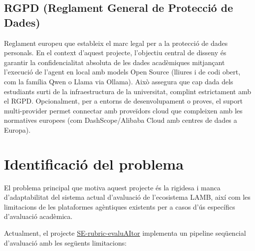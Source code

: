 \documentclass[12pt,a4paper,twoside]{report}
\begin{document}
\subsection{RGPD (Reglament General de Protecci\'o de Dades)}
\label{subsec:rgpd}

Reglament europeu que estableix el marc legal per a la protecci\'o de dades personals. En el context d'aquest projecte, l'objectiu central de disseny \'es garantir la confidencialitat absoluta de les dades acad\`emiques mitjan\c{c}ant l'execuci\'o de l'agent en local amb models Open Source (lliures i de codi obert, com la fam\'ilia Qwen o Llama via Ollama). Aix\`o assegura que cap dada dels estudiants surti de la infraestructura de la universitat, complint estrictament amb el RGPD. Opcionalment, per a entorns de desenvolupament o proves, el suport multi-provider permet connectar amb prove\"idors cloud que compleixen amb les normatives europees (com DashScope/Alibaba Cloud amb centres de dades a Europa).

\section{Identificaci\'o del problema}
\label{sec:identificacio-problema}

El problema principal que motiva aquest projecte \'es la rigidesa i manca d'adaptabilitat del sistema actual d'avaluaci\'o de l'ecosistema LAMB, aix\'i com les limitacions de les plataformes ag\`entiques existents per a casos d'\'us espec\'ifics d'avaluaci\'o acad\`emica.

Actualment, el projecte \href{https://github.com/Lamb-Project/SE-rubric-evaluAItor}{SE-rubric-evaluAItor} implementa un pipeline seq\"uencial d'avaluaci\'o amb les seg\"uents limitacions:
\end{document}
